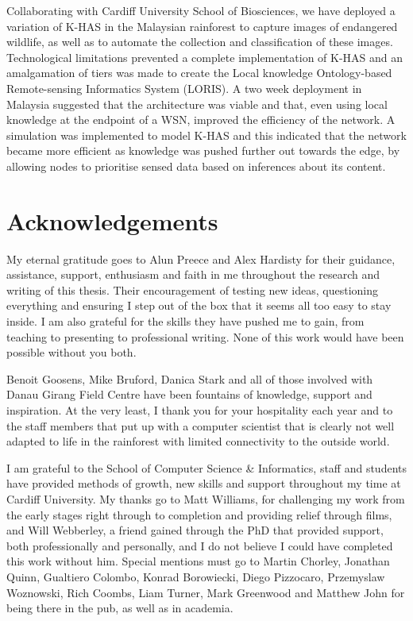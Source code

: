 \documentclass[a4paper,oneside,onecolumn,openright,12pt]{book}
\begin{document}
Collaborating with Cardiff University School of Biosciences, we have deployed a variation of K-HAS in the Malaysian rainforest to capture images of endangered wildlife, as well as to automate the collection and classification of these images. Technological limitations prevented a complete implementation of K-HAS and an amalgamation of tiers was made to create the Local knowledge Ontology-based Remote-sensing Informatics System (LORIS). A two week deployment in Malaysia suggested that the architecture was viable and that, even using local knowledge at the endpoint of a WSN, improved the efficiency of the network. A simulation was implemented to model K-HAS and this indicated that the network became more efficient as knowledge was pushed further out towards the edge, by allowing nodes to prioritise sensed data based on inferences about its content.

\chapter*{Acknowledgements}

My eternal gratitude goes to Alun Preece and Alex Hardisty for their guidance, assistance, support, enthusiasm and faith in me throughout the research and writing of this thesis. Their encouragement of testing new ideas, questioning everything and ensuring I step out of the box that it seems all too easy to stay inside. I am also grateful for the skills they have pushed me to gain, from teaching to presenting to professional writing. None of this work would have been possible without you both.

Benoit Goosens, Mike Bruford, Danica Stark and all of those involved with Danau Girang Field Centre have been fountains of knowledge, support and inspiration. At the very least, I thank you for your hospitality each year and to the staff members that put up with a computer scientist that is clearly not well adapted to life in the rainforest with limited connectivity to the outside world. 

I am grateful to the School of Computer Science \& Informatics, staff and students have provided methods of growth, new skills and support throughout my time at Cardiff University. My thanks go to Matt Williams, for challenging my work from the early stages right through to completion and providing relief through films, and Will Webberley, a friend gained through the PhD that provided support, both professionally and personally, and I do not believe I could have completed this work without him. Special mentions must go to Martin Chorley, Jonathan Quinn, Gualtiero Colombo, Konrad Borowiecki, Diego Pizzocaro, Przemyslaw Woznowski, Rich Coombs, Liam Turner, Mark Greenwood and Matthew John for being there in the pub, as well as in academia.
\end{document}
